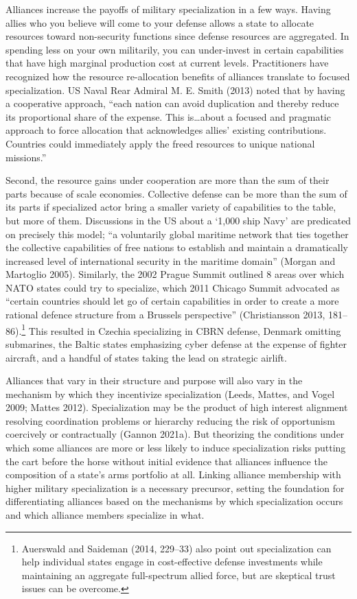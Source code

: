 \documentclass[
  12,
  letterpaper,
  DIV=11,
  numbers=noendperiod]{scrartcl}
\begin{document}
Alliances increase the payoffs of military specialization in a few ways.
Having allies who you believe will come to your defense allows a state
to allocate resources toward non-security functions since defense
resources are aggregated. In spending less on your own militarily, you
can under-invest in certain capabilities that have high marginal
production cost at current levels. Practitioners have recognized how the
resource re-allocation benefits of alliances translate to focused
specialization. US Naval Rear Admiral M. E. Smith (2013) noted that by
having a cooperative approach, ``each nation can avoid duplication and
thereby reduce its proportional share of the expense. This
is\ldots about a focused and pragmatic approach to force allocation that
acknowledges allies' existing contributions. Countries could immediately
apply the freed resources to unique national missions.''

Second, the resource gains under cooperation are more than the sum of
their parts because of scale economies. Collective defense can be more
than the sum of its parts if specialized actor bring a smaller variety
of capabilities to the table, but more of them. Discussions in the US
about a `1,000 ship Navy' are predicated on precisely this model; ``a
voluntarily global maritime network that ties together the collective
capabilities of free nations to establish and maintain a dramatically
increased level of international security in the maritime domain''
(Morgan and Martoglio 2005). Similarly, the 2002 Prague Summit outlined
8 areas over which NATO states could try to specialize, which 2011
Chicago Summit advocated as ``certain countries should let go of certain
capabilities in order to create a more rational defence structure from a
Brussels perspective'' (Christiansson 2013, 181--86).\footnote{Auerswald
  and Saideman (2014, 229--33) also point out specialization can help
  individual states engage in cost-effective defense investments while
  maintaining an aggregate full-spectrum allied force, but are skeptical
  trust issues can be overcome.} This resulted in Czechia specializing
in CBRN defense, Denmark omitting submarines, the Baltic states
emphasizing cyber defense at the expense of fighter aircraft, and a
handful of states taking the lead on strategic airlift.

Alliances that vary in their structure and purpose will also vary in the
mechanism by which they incentivize specialization (Leeds, Mattes, and
Vogel 2009; Mattes 2012). Specialization may be the product of high
interest alignment resolving coordination problems or hierarchy reducing
the risk of opportunism coercively or contractually (Gannon 2021a). But
theorizing the conditions under which some alliances are more or less
likely to induce specialization risks putting the cart before the horse
without initial evidence that alliances influence the composition of a
state's arms portfolio at all. Linking alliance membership with higher
military specialization is a necessary precursor, setting the foundation
for differentiating alliances based on the mechanisms by which
specialization occurs and which alliance members specialize in what.
\end{document}
